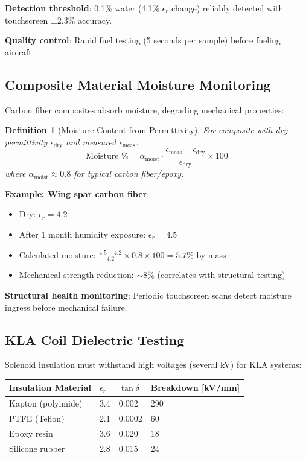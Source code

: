 \documentclass[12pt,a4paper]{article}
\newtheorem{definition}{Definition}
\begin{document}
\textbf{Detection threshold}: 0.1\% water (4.1\% $\epsilon_r$ change) reliably detected with touchscreen ±2.3\% accuracy.

\textbf{Quality control}: Rapid fuel testing (5 seconds per sample) before fueling aircraft.

\subsection{Composite Material Moisture Monitoring}

Carbon fiber composites absorb moisture, degrading mechanical properties:

\begin{definition}[Moisture Content from Permittivity]
For composite with dry permittivity $\epsilon_{\text{dry}}$ and measured $\epsilon_{\text{meas}}$:
\begin{equation}
\text{Moisture \%} = \alpha_{\text{moist}} \cdot \frac{\epsilon_{\text{meas}} - \epsilon_{\text{dry}}}{\epsilon_{\text{dry}}} \times 100
\end{equation}
where $\alpha_{\text{moist}} \approx 0.8$ for typical carbon fiber/epoxy.
\end{definition}

\textbf{Example: Wing spar carbon fiber}:
\begin{itemize}
\item Dry: $\epsilon_r = 4.2$
\item After 1 month humidity exposure: $\epsilon_r = 4.5$
\item Calculated moisture: $\frac{4.5-4.2}{4.2} \times 0.8 \times 100 = 5.7\%$ by mass
\item Mechanical strength reduction: $\sim 8\%$ (correlates with structural testing)
\end{itemize}

\textbf{Structural health monitoring}: Periodic touchscreen scans detect moisture ingress before mechanical failure.

\subsection{KLA Coil Dielectric Testing}

Solenoid insulation must withstand high voltages (several kV) for KLA systems:

\begin{center}
\begin{tabular}{|l|l|l|l|}
\hline
\textbf{Insulation Material} & \textbf{$\epsilon_r$} & \textbf{$\tan\delta$} & \textbf{Breakdown [kV/mm]} \\
\hline
Kapton (polyimide) & 3.4 & 0.002 & 290 \\
PTFE (Teflon) & 2.1 & 0.0002 & 60 \\
Epoxy resin & 3.6 & 0.020 & 18 \\
Silicone rubber & 2.8 & 0.015 & 24 \\
\hline
\end{tabular}
\end{center}
\end{document}
